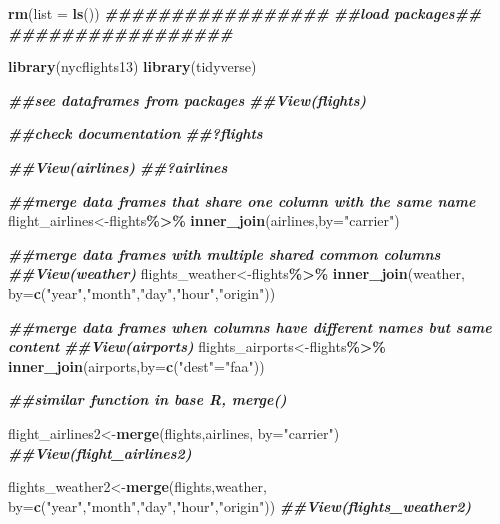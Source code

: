 \documentclass[
  openany]{book}
\newenvironment{Shaded}{\begin{snugshade}}{\end{snugshade}}
\newcommand{\AttributeTok}[1]{\textcolor[rgb]{0.13,0.29,0.53}{#1}}
\newcommand{\DocumentationTok}[1]{\textcolor[rgb]{0.56,0.35,0.01}{\textbf{\textit{#1}}}}
\newcommand{\FunctionTok}[1]{\textcolor[rgb]{0.13,0.29,0.53}{\textbf{#1}}}
\newcommand{\NormalTok}[1]{#1}
\newcommand{\OtherTok}[1]{\textcolor[rgb]{0.56,0.35,0.01}{#1}}
\newcommand{\SpecialCharTok}[1]{\textcolor[rgb]{0.81,0.36,0.00}{\textbf{#1}}}
\newcommand{\StringTok}[1]{\textcolor[rgb]{0.31,0.60,0.02}{#1}}
\begin{document}
\begin{Shaded}
\begin{Highlighting}[]
\FunctionTok{rm}\NormalTok{(}\AttributeTok{list =} \FunctionTok{ls}\NormalTok{())}
\DocumentationTok{\#\#\#\#\#\#\#\#\#\#\#\#\#\#\#\#\#}
\DocumentationTok{\#\#load packages\#\#}
\DocumentationTok{\#\#\#\#\#\#\#\#\#\#\#\#\#\#\#\#\#}

\FunctionTok{library}\NormalTok{(nycflights13)}
\FunctionTok{library}\NormalTok{(tidyverse)}

\DocumentationTok{\#\#see dataframes from packages}
\DocumentationTok{\#\#View(flights)}

\DocumentationTok{\#\#check documentation}
\DocumentationTok{\#\#?flights}

\DocumentationTok{\#\#View(airlines)}
\DocumentationTok{\#\#?airlines}

\DocumentationTok{\#\#merge data frames that share one column with the same name}
\NormalTok{flight\_airlines}\OtherTok{\textless{}{-}}\NormalTok{flights}\SpecialCharTok{\%\textgreater{}\%}
  \FunctionTok{inner\_join}\NormalTok{(airlines,}\AttributeTok{by=}\StringTok{"carrier"}\NormalTok{)}

\DocumentationTok{\#\#merge data frames with multiple shared common columns}
\DocumentationTok{\#\#View(weather)}
\NormalTok{flights\_weather}\OtherTok{\textless{}{-}}\NormalTok{flights}\SpecialCharTok{\%\textgreater{}\%}
  \FunctionTok{inner\_join}\NormalTok{(weather, }\AttributeTok{by=}\FunctionTok{c}\NormalTok{(}\StringTok{"year"}\NormalTok{,}\StringTok{"month"}\NormalTok{,}\StringTok{"day"}\NormalTok{,}\StringTok{"hour"}\NormalTok{,}\StringTok{"origin"}\NormalTok{))}

\DocumentationTok{\#\#merge data frames when columns have different names but same content}
\DocumentationTok{\#\#View(airports)}
\NormalTok{flights\_airports}\OtherTok{\textless{}{-}}\NormalTok{flights}\SpecialCharTok{\%\textgreater{}\%}
  \FunctionTok{inner\_join}\NormalTok{(airports,}\AttributeTok{by=}\FunctionTok{c}\NormalTok{(}\StringTok{"dest"}\OtherTok{=}\StringTok{"faa"}\NormalTok{))}

\DocumentationTok{\#\#similar function in base R, merge()}

\NormalTok{flight\_airlines2}\OtherTok{\textless{}{-}}\FunctionTok{merge}\NormalTok{(flights,airlines, }\AttributeTok{by=}\StringTok{"carrier"}\NormalTok{)}
\DocumentationTok{\#\#View(flight\_airlines2)}

\NormalTok{flights\_weather2}\OtherTok{\textless{}{-}}\FunctionTok{merge}\NormalTok{(flights,weather, }\AttributeTok{by=}\FunctionTok{c}\NormalTok{(}\StringTok{"year"}\NormalTok{,}\StringTok{"month"}\NormalTok{,}\StringTok{"day"}\NormalTok{,}\StringTok{"hour"}\NormalTok{,}\StringTok{"origin"}\NormalTok{))}
\DocumentationTok{\#\#View(flights\_weather2)}


\end{Highlighting}
\end{Shaded}
\end{document}
